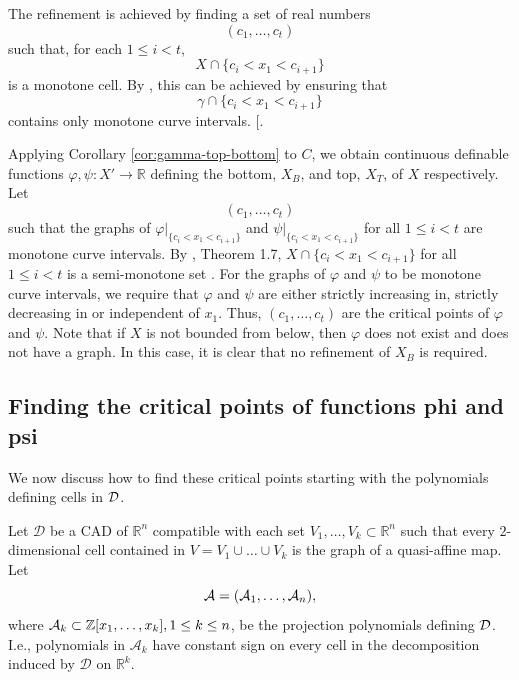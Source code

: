 \documentclass[
]{book}
\theoremstyle{definition}
\theoremstyle{definition}
\theoremstyle{definition}
\theoremstyle{definition}
\theoremstyle{remark}
\begin{document}
The refinement is achieved by finding a set of real numbers
\[
(c_1,\ldots,c_t)
\]
such that, for each \(1 \le i < t\),
\[
X \cap \{c_i < x_1 < c_{i+1}\}
\]
is a monotone cell. By \citep[Theorem 1.7]{bgv13}, this can be achieved by ensuring that
\[
\gamma \cap \{ c_i < x_1 < c_{i+1}\}
\]
contains only monotone curve intervals. {[}\citet[Theorem 3.18]{bgv15}.

Applying Corollary \ref{cor:gamma-top-bottom} to \(C\), we obtain continuous definable functions \(\varphi,\psi : X' \to \mathbb{R}\) defining the bottom, \(X_B\), and top, \(X_T\), of \(X\) respectively.
Let \[
(c_1,\ldots,c_t)
\]
such that the graphs of \(\varphi\vert_{\{ c_i < x_1 < c_{i+1} \}}\) and \(\psi\vert_{\{ c_i < x_1 < c_{i+1} \}}\) for all \(1 \le i < t\) are monotone curve intervals. By \citet{bgv15}, Theorem 1.7, \(X \cap \{ c_i < x_1 < c_{i+1} \}\) for all \(1\le i < t\) is a semi-monotone set \citep[proof of Lemma 3.18]{bgv15}.
For the graphs of \(\varphi\) and \(\psi\) to be monotone curve intervals, we require that \(\varphi\) and \(\psi\) are either strictly increasing in, strictly decreasing in or independent of \(x_1\). Thus, \((c_1,\ldots,c_t)\) are the critical points of \(\varphi\) and \(\psi\).
Note that if \(X\) is not bounded from below, then \(\varphi\) does not exist and does not have a graph.
In this case, it is clear that no refinement of \(X_B\) is required.

\hypertarget{sec:lagrange-refinement}{%
\subsection{Finding the critical points of functions phi and psi}\label{sec:lagrange-refinement}}

We now discuss how to find these critical points starting with the polynomials defining cells in \(\cal D\).

Let \(\mathcal{D}\) be a CAD of \(\mathbb{R}^n\) compatible with each set \(V_1,\ldots,V_k \subset \mathbb{R}^n\) such that every \(2\)-dimensional cell contained in \(V = V_1\cup\ldots\cup V_k\) is the graph of a quasi-affine map. Let
\begin{equation}
{\cal A} = ({\cal A}_1,\ldots,{\cal A}_n),
\label{eq:proj-fac-set}
\end{equation}
where \({\cal A}_k \subset \mathbb{Z}[x_1,\ldots,x_k], 1 \le k \le n\), be the projection polynomials defining \(\cal D\).
I.e., polynomials in \(\mathcal{A}_k\) have constant sign on every cell in the decomposition induced by \(\mathcal{D}\) on \(\mathbb{R}^k\).
\end{document}
